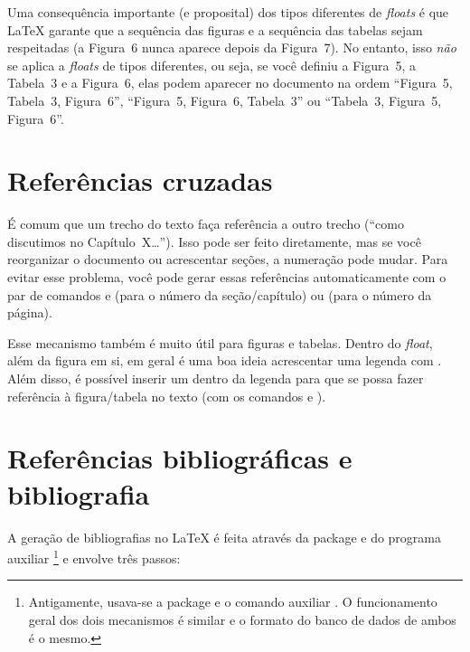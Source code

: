 Uma consequência importante (e proposital) dos tipos diferentes de
\emph{floats} é que \LaTeX{} garante que a sequência
das figuras e a sequência das tabelas sejam respeitadas (a Figura~6 nunca
aparece depois da Figura~7). No entanto, isso \emph{não} se aplica a
\emph{floats} de tipos diferentes, ou seja, se você definiu a Figura~5,
a Tabela~3 e a Figura~6, elas podem aparecer no documento na ordem
``Figura~5, Tabela~3, Figura~6'', ``Figura~5, Figura~6, Tabela~3'' ou
``Tabela~3, Figura~5, Figura~6''.

\section{Referências cruzadas}
\label{sec:refs}

É comum que um trecho do texto faça referência a outro trecho (``como
discutimos no Capítulo~X\ldots''). Isso pode ser feito diretamente, mas
se você reorganizar o documento ou acrescentar seções, a numeração pode
mudar. Para evitar esse problema, você pode gerar essas referências
automaticamente com o par de comandos  e
 (para o número da seção/capítulo) ou
 (para o número da página).

Esse mecanismo também é muito útil para figuras e tabelas. Dentro do
\emph{float}, além da figura em si, em geral é uma boa ideia acrescentar
uma legenda com . Além disso, é possível
inserir um  dentro da legenda para que se possa fazer
referência à figura/tabela no texto (com os comandos  e
).

\section{Referências bibliográficas e bibliografia}

A geração de bibliografias no \LaTeX{} é feita através da package
 e do programa auxiliar
\footnote{Antigamente, usava-se a package
 e o comando auxiliar .
O funcionamento geral dos dois mecanismos é similar e o formato do banco
de dados de ambos é o mesmo.} e envolve três passos:

